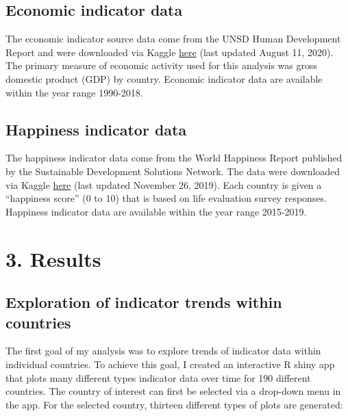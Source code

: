 \documentclass[
]{article}
\begin{document}
\hypertarget{economic-indicator-data}{%
\subsection{Economic indicator data}\label{economic-indicator-data}}

The economic indicator source data come from the UNSD Human Development
Report and were downloaded via Kaggle
\href{https://www.kaggle.com/frankmollard/income-by-country}{here} (last
updated August 11, 2020). The primary measure of economic activity used
for this analysis was gross domestic product (GDP) by country. Economic
indicator data are available within the year range 1990-2018.

\hypertarget{happiness-indicator-data}{%
\subsection{Happiness indicator data}\label{happiness-indicator-data}}

The happiness indicator data come from the World Happiness Report
published by the Sustainable Development Solutions Network. The data
were downloaded via Kaggle
\href{https://www.kaggle.com/unsdsn/world-happiness}{here} (last updated
November 26, 2019). Each country is given a ``happiness score'' (0 to
10) that is based on life evaluation survey responses. Happiness
indicator data are available within the year range 2015-2019.

\hypertarget{results}{%
\section{3. Results}\label{results}}

\hypertarget{exploration-of-indicator-trends-within-countries}{%
\subsection{Exploration of indicator trends within
countries}\label{exploration-of-indicator-trends-within-countries}}

The first goal of my analysis was to explore trends of indicator data
within individual countries. To achieve this goal, I created an
interactive R shiny app that plots many different types indicator data
over time for 190 different countries. The country of interest can first
be selected via a drop-down menu in the app. For the selected country,
thirteen different types of plots are generated:
\end{document}
